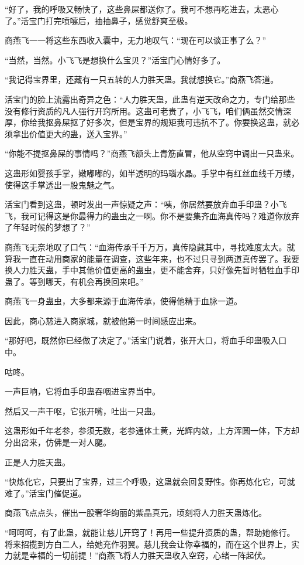 \begin{this_body}
“好了，我的呼吸又畅快了，这些鼻屎都送你了。我可不想再吃进去，太恶心了。”活宝门打完喷嚏后，抽抽鼻子，感觉舒爽至极。

商燕飞一一将这些东西收入囊中，无力地叹气：“现在可以谈正事了么？”

“当然，当然。小飞飞是想换什么宝贝？”活宝门心情好多了。

“我记得宝界里，还藏有一只五转的人力胜天蛊。我就想换它。”商燕飞答道。

活宝门的脸上流露出奇异之色：“人力胜天蛊，此蛊有逆天改命之力，专门给那些没有修行资质的凡人强行开窍所用。这蛊可老贵了，小飞飞，咱们俩虽然交情深厚，你给我抠鼻屎抠了好多次，但是宝界的规矩我可违抗不了。你要换这蛊，就必须拿出价值更大的蛊，送入宝界。”

“你能不提抠鼻屎的事情吗？”商燕飞额头上青筋直冒，他从空窍中调出一只蛊来。

这蛊形如婴孩手掌，嫩嘟嘟的，如半透明的玛瑙水晶。手掌中有红丝血线千万缕，使得这手掌透出一股鬼魅之气。

活宝门看到这蛊，顿时发出一声惊疑之声：“咦，你居然要放弃血手印蛊？小飞飞，我可记得这是你最得力的蛊虫之一啊。你不是要集齐血海真传吗？难道你放弃了年轻时候的梦想了？”

商燕飞无奈地叹了口气：“血海传承千千万万，真传隐藏其中，寻找难度太大。就算我一直在动用商家的能量在调查，这些年来，也不过只寻到两道真传罢了。我要换人力胜天蛊，手中其他价值更高的蛊虫，更不能舍弃，只好像先暂时牺牲血手印蛊了。等到哪天，有机会再换回来吧。”

商燕飞一身蛊虫，大多都来源于血海传承，使得他精于血脉一道。

因此，商心慈进入商家城，就被他第一时间感应出来。

“那好吧，既然你已经做了决定了。”活宝门说着，张开大口，将血手印蛊吸入口中。

咕咚。

一声巨响，它将血手印蛊吞咽进宝界当中。

然后又一声干呕，它张开嘴，吐出一只蛊。

这蛊形如千年老参，参须无数，老参通体土黄，光辉内敛，上方浑圆一体，下方却分出岔来，仿佛是一对人腿。

正是人力胜天蛊。

“快炼化它，只要出了宝界，过三个呼吸，这蛊就会回复野性。你再炼化它，可就难了。”活宝门催促道。

商燕飞点点头，催出一股奢华绚丽的紫晶真元，顷刻将人力胜天蛊炼化。

“呵呵呵，有了此蛊，就能让慈儿开窍了！再用一些提升资质的蛊，帮助她修行。将来招揽到方白二人，给她充作羽翼。慈儿我会让你幸福的，而在这个世界上，实力就是幸福的一切前提！”商燕飞将人力胜天蛊收入空窍，心绪一阵起伏。


\end{this_body}

